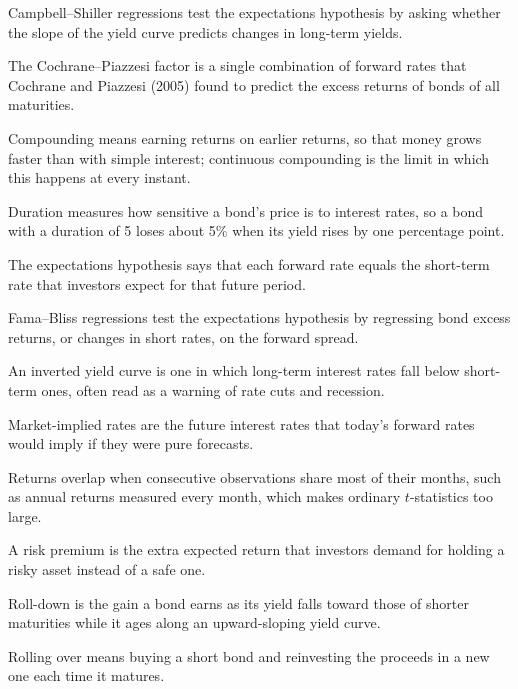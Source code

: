 \begin{keyterms}
\small
\begin{description}[leftmargin=0pt, itemsep=2pt, parsep=0pt, font=\normalfont\bfseries\color{FEMaroon}]
  \item[Campbell--Shiller regressions.] Campbell--Shiller regressions test the expectations hypothesis by asking whether the slope of the yield curve predicts changes in long-term yields.
  \item[Cochrane--Piazzesi factor.] The Cochrane--Piazzesi factor is a single combination of forward rates that Cochrane and Piazzesi (2005) found to predict the excess returns of bonds of all maturities.
  \item[Compounding.] Compounding means earning returns on earlier returns, so that money grows faster than with simple interest; continuous compounding is the limit in which this happens at every instant.
  \item[Duration.] Duration measures how sensitive a bond's price is to interest rates, so a bond with a duration of 5 loses about 5\% when its yield rises by one percentage point.
  \item[Expectations hypothesis.] The expectations hypothesis says that each forward rate equals the short-term rate that investors expect for that future period.
  \item[Fama--Bliss regressions.] Fama--Bliss regressions test the expectations hypothesis by regressing bond excess returns, or changes in short rates, on the forward spread.
  \item[Inverted yield curve.] An inverted yield curve is one in which long-term interest rates fall below short-term ones, often read as a warning of rate cuts and recession.
  \item[Market-implied rates.] Market-implied rates are the future interest rates that today's forward rates would imply if they were pure forecasts.
  \item[Overlapping returns.] Returns overlap when consecutive observations share most of their months, such as annual returns measured every month, which makes ordinary $t$-statistics too large.
  \item[Risk premium.] A risk premium is the extra expected return that investors demand for holding a risky asset instead of a safe one.
  \item[Roll-down.] Roll-down is the gain a bond earns as its yield falls toward those of shorter maturities while it ages along an upward-sloping yield curve.
  \item[Rolling over.] Rolling over means buying a short bond and reinvesting the proceeds in a new one each time it matures.

\end{description}
\end{keyterms}
